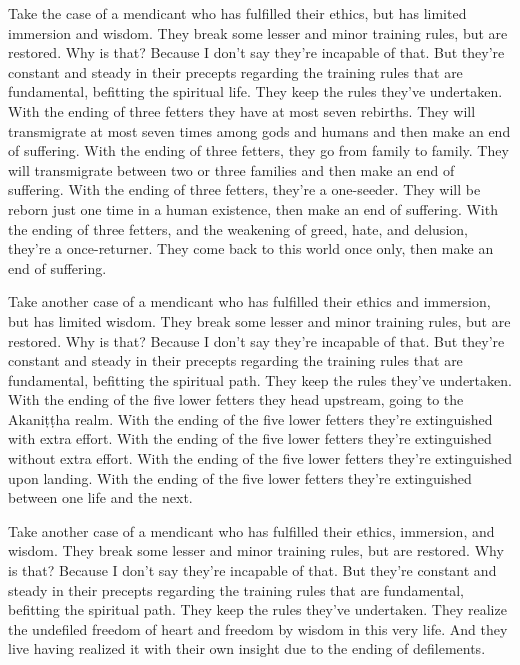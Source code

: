 \documentclass[12pt,openany]{book}%
\begin{document}
Take the case of a mendicant who has fulfilled their ethics, but has limited immersion and wisdom. They break some lesser and minor training rules, but are restored. Why is that? Because I don’t say they’re incapable of that. But they’re constant and steady in their precepts regarding the training rules that are fundamental, befitting the spiritual life. They keep the rules they’ve undertaken. With the ending of three fetters they have at most seven rebirths. They will transmigrate at most seven times among gods and humans and then make an end of suffering. With the ending of three fetters, they go from family to family. They will transmigrate between two or three families and then make an end of suffering. With the ending of three fetters, they’re a one-seeder. They will be reborn just one time in a human existence, then make an end of suffering. With the ending of three fetters, and the weakening of greed, hate, and delusion, they’re a once-returner. They come back to this world once only, then make an end of suffering. 

Take another case of a mendicant who has fulfilled their ethics and immersion, but has limited wisdom. They break some lesser and minor training rules, but are restored. Why is that? Because I don’t say they’re incapable of that. But they’re constant and steady in their precepts regarding the training rules that are fundamental, befitting the spiritual path. They keep the rules they’ve undertaken. With the ending of the five lower fetters they head upstream, going to the \textsanskrit{Akaniṭṭha} realm. With the ending of the five lower fetters they’re extinguished with extra effort. With the ending of the five lower fetters they’re extinguished without extra effort. With the ending of the five lower fetters they’re extinguished upon landing. With the ending of the five lower fetters they’re extinguished between one life and the next. 

Take another case of a mendicant who has fulfilled their ethics, immersion, and wisdom. They break some lesser and minor training rules, but are restored. Why is that? Because I don’t say they’re incapable of that. But they’re constant and steady in their precepts regarding the training rules that are fundamental, befitting the spiritual path. They keep the rules they’ve undertaken. They realize the undefiled freedom of heart and freedom by wisdom in this very life. And they live having realized it with their own insight due to the ending of defilements. 
\end{document}
